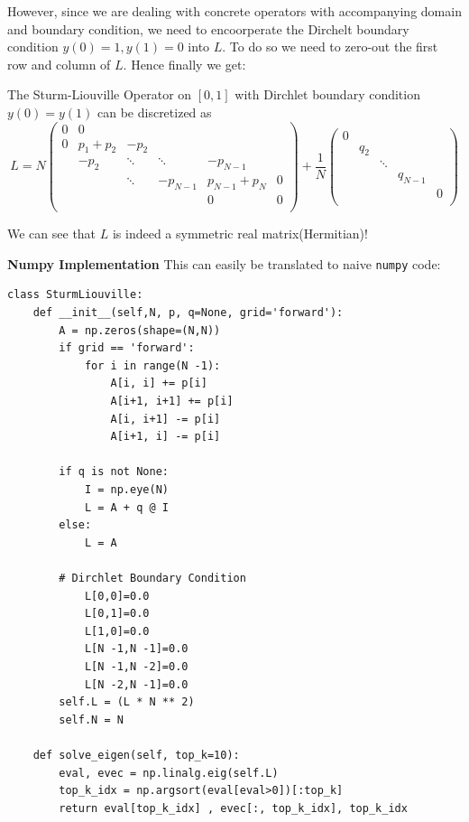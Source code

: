 However, since we are dealing with concrete operators with accompanying domain and boundary condition, we need to encoorperate the Dirchelt boundary condition $y(0)=1, y(1)=0$ into $L$. To do so we need to zero-out the first row and column of $L$. Hence finally we get:

\begin{proposition}The Sturm-Liouville Operator on $[0,1]$ with Dirchlet boundary condition $y(0)=y(1)$ can be discretized as
\begin{equation}
\label{discreteSL}
L=N\begin{pmatrix}
0 &0 & & &  &\\
0 &p_1+p_2 & -p_2& & & \\
&-p_2&  \ddots &\ddots & -p_{N-1}& \\
& & \ddots &-p_{N-1} & p_{N-1}+p_N &0 \\
& & & &0 & 0\\
\end{pmatrix} 
+ 
\frac{1}{N}\begin{pmatrix}0 & & & & \\
& q_2 & & & \\
&  & \ddots& & \\
& & & q_{N-1} & \\
& &  & & 0  \\
\end{pmatrix}
\end{equation}

\end{proposition}We can see that $L$ is indeed a symmetric real matrix(Hermitian)!

\textbf{Numpy Implementation}
This can easily be translated to naive \texttt{numpy} code:

\begin{verbatim}
class SturmLiouville:
    def __init__(self,N, p, q=None, grid='forward'):
        A = np.zeros(shape=(N,N))
        if grid == 'forward':
            for i in range(N -1):
                A[i, i] += p[i]
                A[i+1, i+1] += p[i]
                A[i, i+1] -= p[i]
                A[i+1, i] -= p[i]

        if q is not None:
            I = np.eye(N) 
            L = A + q @ I
        else:
            L = A
        
        # Dirchlet Boundary Condition
            L[0,0]=0.0
            L[0,1]=0.0
            L[1,0]=0.0
            L[N -1,N -1]=0.0
            L[N -1,N -2]=0.0
            L[N -2,N -1]=0.0
        self.L = (L * N ** 2)
        self.N = N

    def solve_eigen(self, top_k=10):
        eval, evec = np.linalg.eig(self.L)
        top_k_idx = np.argsort(eval[eval>0])[:top_k]
        return eval[top_k_idx] , evec[:, top_k_idx], top_k_idx
\end{verbatim}

